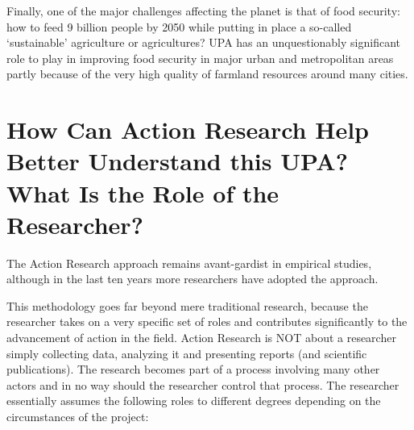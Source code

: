 \documentclass[10pt,a4paper]{article}
\begin{document}
\begin{multicols}{2}
Finally, one of the major challenges affecting the planet is that of food security: how to feed 9 billion people by 2050 \citep{r16} while putting in place a so-called `sustainable' agriculture or agricultures? UPA has an unquestionably significant role to play in improving food security in major urban and metropolitan areas partly because of the very high quality of farmland resources around many cities.

\section{How Can Action Research Help Better Understand this UPA? What Is the Role of the Researcher?}
\noindent The Action Research approach remains avant-gardist in empirical studies, although in the last ten years more researchers have adopted the approach.

This methodology goes far beyond mere traditional research, because the researcher takes on a very specific set of roles and contributes significantly to the advancement of action in the field. Action Research is NOT about a researcher simply collecting data, analyzing it and presenting reports (and scientific publications). The research becomes part of a process involving many other actors and in no way should the researcher control that process. The researcher essentially assumes the following roles to different degrees depending on the circumstances of the project:


\end{multicols}
\end{document}
